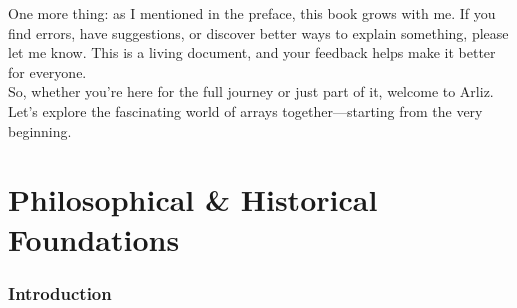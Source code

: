 \documentclass[12pt, oneside, openany]{book}
\begin{document}
One more thing: as I mentioned in the preface, this book grows with me. If you find errors, have suggestions, or discover better ways to explain something, please let me know. This is a living document, and your feedback helps make it better for everyone.\\
So, whether you're here for the full journey or just part of it, welcome to Arliz. Let's explore the fascinating world of arrays together—starting from the very beginning.\\


\part{Philosophical \& Historical Foundations}

\section*{Introduction}
\end{document}
